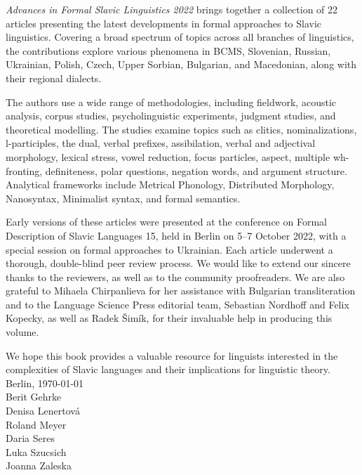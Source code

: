 \largerpage
\textit{Advances in Formal Slavic Linguistics 2022} brings together a collection of 22 articles presenting the latest developments in formal approaches to Slavic linguistics. Covering a broad spectrum of topics across all branches of linguistics, %
the contributions explore various phenomena in BCMS, Slovenian, Russian, Ukrainian, Polish, Czech, Upper Sorbian, Bulgarian, and Macedonian, along with their regional dialects.

The authors use a wide range of methodologies, including fieldwork, acoustic analysis, corpus studies, psycholinguistic experiments, judgment studies, and theoretical modelling. The studies examine topics such as clitics, nominalizations, l-participles, the dual, verbal prefixes, assibilation, verbal and adjectival morphology, lexical stress, vowel reduction, focus particles, aspect, multiple wh-fronting, definiteness, polar questions, negation words, and argument structure. %
Analytical frameworks include Metrical Phonology, Distributed Morphology, Nanosyntax, Minimalist syntax, and formal semantics.

Early versions of these articles were presented at the conference on Formal Description of Slavic Languages 15, held in Berlin on 5–7 October 2022, with a special session on formal approaches to Ukrainian. Each article underwent a thorough, double-blind peer review process. We would like to extend our sincere thanks to the reviewers, as well as to the community proofreaders. We are also grateful to Mihaela Chirpanlieva for her assistance with Bulgarian transliteration and to the Language Science Press editorial team, Sebastian Nordhoff and Felix Kopecky, as well as Radek Šimík, for their invaluable help in producing this volume.

We hope this book provides a valuable resource for linguists interested in the complexities of Slavic languages and their implications for linguistic theory.\\

\hfill Berlin, \today   \\
{}\hfill Berit Gehrke\\
{}\hfill Denisa Lenertová\\
{}\hfill Roland Meyer\\
{}\hfill Daria Seres\\
{}\hfill Luka Szucsich\\
{}\hfill Joanna Zaleska

